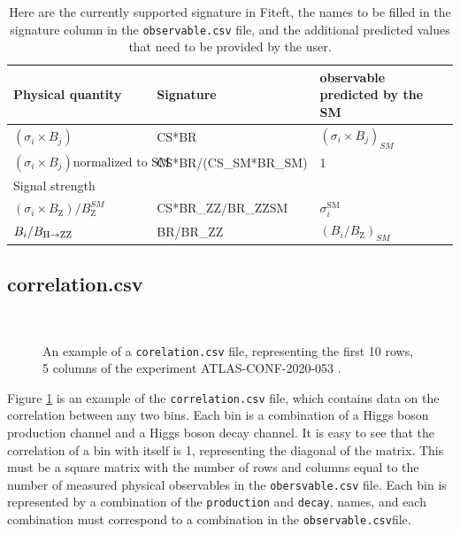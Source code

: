 \documentclass[12pt]{article}
\newlength{\mywidth}\setlength{\mywidth}{14.5cm}
\newcommand{\SM}{\text{SM}}
\begin{document}
  \begin{table}
   \begin{tabular}{|l|l|l|l|}
 \hline
 Physical quantity & Signature & observable predicted by the SM \\[0.25cm] \hline
 $(\sigma_i \times B_j)$  & CS*BR & $(\sigma_i \times B_j)_{SM}$  \\[0.25cm] \hline
 $(\sigma_i \times B_j) \text{normalized to SM}$ & CS*BR/(CS\_SM*BR\_SM)  & 1 \\
 Signal strength && \\ [0.25cm] \hline
 $(\sigma_i \times B_\mathrm{Z} )/B_\mathrm{Z}^{SM}$ & CS*BR\_ZZ/BR\_ZZSM  & $\sigma^{\SM}_i$\\[0.25cm] \hline
 $B_i/B_{\rm H\to ZZ}$ & BR/BR\_ZZ &  $(B_i/B_\mathrm{Z})_{SM}$ \\ \hline
 \end{tabular}
 \caption{Here are the currently supported signature in Fiteft, the names to be filled in the signature column in the \texttt{observable.csv} file, and the additional predicted values that need to be provided by the user.}
 \label{table:signature}
 \end{table}
 
 \subsection{correlation.csv}
 
 \begin{figure}[!h]
 \resizebox{\textwidth}{!}{
 
 }\\
 \caption{An example of a \texttt{corelation.csv} file, representing the first 10 rows, 5 columns of the experiment ATLAS-CONF-2020-053 \cite{ATLAS:2020naq}. \label{fig:cor_table}}
 \end{figure}
 
Figure  \ref{fig:cor_table} is an example of the \verb|correlation.csv| file, which contains data on the correlation between any two bins. Each bin is a combination of a Higgs boson production channel and a Higgs boson decay channel. It is easy to see that the correlation of a bin with itself is 1, representing the diagonal of the matrix. This must be a square matrix with the number of rows and columns equal to the number of measured physical observables in the \verb|obersvable.csv| file. Each bin is represented by a combination of the \verb|production| and \verb|decay|, names, and each combination must correspond to a combination in the \verb|observable.csv|file.
\end{document}
